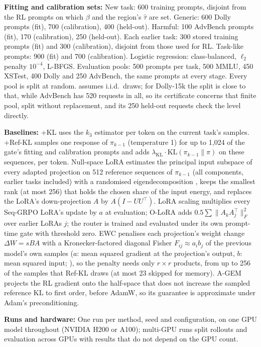 \documentclass{article}
\theoremstyle{plain}
\theoremstyle{definition}
\theoremstyle{remark}
\newcommand{\KL}{\mathrm{KL}}
\begin{document}
\textbf{Fitting and calibration sets:} New task: 600 training prompts, disjoint from the RL prompts on which $\beta$ and
the region's $\hat\tau$ are set. Generic: 600 Dolly prompts (fit), 700
(calibration), 400 (held-out). Harmful: 100 AdvBench prompts (fit), 170 (calibration), 250 (held-out). Each earlier
task: 300 stored training prompts (fit) and 300 (calibration), disjoint from those used for RL. Task-like prompts:
900 (fit) and 700 (calibration). Logistic regression: class-balanced, $\ell_2$ penalty $10^{-4}$, L-BFGS. Evaluation
pools: 500 prompts per task, 500 MMLU, 450 XSTest, 400 Dolly and 250 AdvBench, the same prompts at every stage.
Every pool is split at random.  assumes i.i.d.\ draws; for Dolly-15k the split is close to that, while
AdvBench has 520 requests in all, so its certificate concerns that finite pool, split without replacement, and its 250
held-out requests check the level directly.

\textbf{Baselines:} +KL uses the $k_3$ estimator per token on the current task's samples. +Ref-KL
samples one response of $\pi_{k-1}$ (temperature 1) for up to 1{,}024 of the gate's fitting and calibration prompts
and adds $\lambda_{\mathrm{KL}}\cdot\KL(\pi_{k-1}\|\pi)$ on these sequences, per token. Null-space LoRA estimates
the principal input subspace of every adapted projection on 512 reference sequences of $\pi_{k-1}$ (all components,
earlier tasks included) with a randomised eigendecomposition \citep{halko2011finding}, keeps the smallest rank (at
most 256) that holds the chosen share of the input energy, and replaces the LoRA's down-projection $A$ by
$A(I-UU^\top)$. LoRA scaling multiplies every Seq-GRPO LoRA's update by $a$ at evaluation; O-LoRA adds
$0.5\sum\|A_kA_j^\top\|_F^2$ over earlier LoRAs $j$; the router is trained and evaluated under its own
prompt-time gate with threshold zero. EWC penalises each projection's weight change $\Delta W=sBA$ with a
Kronecker-factored diagonal Fisher $F_{ij}\approx a_ib_j$ of the previous model's own samples ($a$: mean squared
gradient at the projection's output, $b$: mean squared input; \citealp{martens2015kfac,ritter2018laplace}), so the
penalty needs only $r\times r$ products, from up to 256 of the samples that Ref-KL draws (at most 23 skipped for
memory). A-GEM projects the RL gradient onto the half-space that does not increase the sampled reference KL to
first order, before AdamW, so its guarantee is approximate under Adam's preconditioning.

\textbf{Runs and hardware:} One run per method, seed and configuration, on one GPU model throughout (NVIDIA H200 or
A100); multi-GPU runs split rollouts and evaluation across GPUs with results that do not depend on the GPU count.
\end{document}
